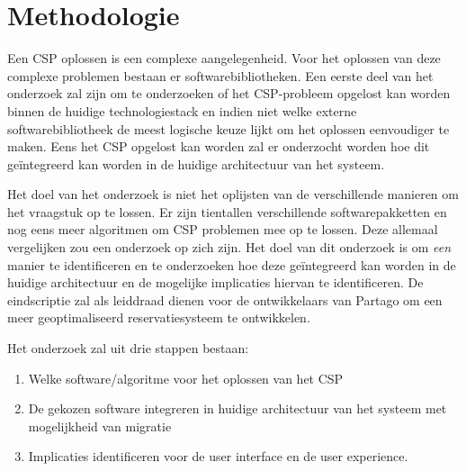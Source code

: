 
\section{Methodologie}
\label{sec:methodologie}
Een CSP oplossen is een complexe aangelegenheid. Voor het oplossen van deze complexe problemen bestaan er softwarebibliotheken. Een eerste deel van het onderzoek zal zijn om te onderzoeken of het CSP-probleem opgelost kan worden binnen de huidige technologiestack en indien niet welke externe softwarebibliotheek de meest logische keuze lijkt om het oplossen eenvoudiger te maken. Eens het CSP opgelost kan worden zal er onderzocht worden hoe dit geïntegreerd kan worden in de huidige architectuur van het systeem. 

Het doel van het onderzoek is niet het oplijsten van de verschillende manieren om het vraagstuk op te lossen. Er zijn tientallen verschillende softwarepakketten en nog eens meer algoritmen om CSP problemen mee op te lossen. Deze allemaal vergelijken zou een onderzoek op zich zijn. Het doel van dit onderzoek is om \textit{een} manier te identificeren en te onderzoeken hoe deze geïntegreerd kan worden in de huidige architectuur en de mogelijke implicaties hiervan te identificeren. De eindscriptie zal als leiddraad dienen voor de ontwikkelaars van Partago om een meer geoptimaliseerd reservatiesysteem te ontwikkelen. 

Het onderzoek zal uit drie stappen bestaan:
\begin{enumerate}
	\item Welke software/algoritme voor het oplossen van het CSP 
	\item De gekozen software integreren in huidige architectuur van het systeem met mogelijkheid van migratie
	\item Implicaties identificeren voor de user interface en de user experience.
\end{enumerate}

